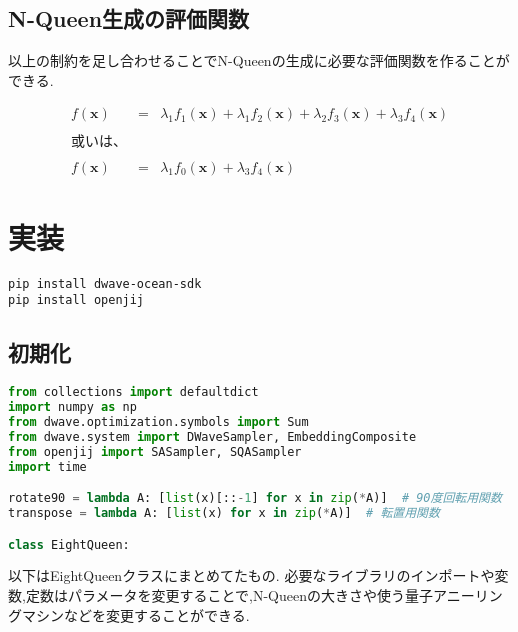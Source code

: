 \documentclass[uplatex,dvipdfmx,a4paper,11pt,oneside,openany]{jsbook}
\begin{document}
\subsection{N-Queen生成の評価関数}

以上の制約を足し合わせることでN-Queenの生成に必要な評価関数を作ることができる.

\begin{eqnarray*}
  f(\bm{x}) &=& \lambda_1 f_1(\bm{x}) + \lambda_1 f_2(\bm{x}) + \lambda_2 f_3(\bm{x}) + \lambda_3 f_4(\bm{x})\\
  \\或いは、\\\\
  f(\bm{x}) &=& \lambda_1 f_0(\bm{x}) + \lambda_3 f_4(\bm{x})
\end{eqnarray*}

\section{実装}

\begin{verbatim}
pip install dwave-ocean-sdk
pip install openjij
\end{verbatim}

\subsection{初期化}

\begin{lstlisting}[language=Python]
from collections import defaultdict
import numpy as np
from dwave.optimization.symbols import Sum
from dwave.system import DWaveSampler, EmbeddingComposite
from openjij import SASampler, SQASampler
import time

rotate90 = lambda A: [list(x)[::-1] for x in zip(*A)]  # 90度回転用関数
transpose = lambda A: [list(x) for x in zip(*A)]  # 転置用関数

class EightQueen:
\end{lstlisting}

以下はEightQueenクラスにまとめてたもの. 必要なライブラリのインポートや変数,定数はパラメータを変更することで,N-Queenの大きさや使う量子アニーリングマシンなどを変更することができる.
\end{document}
